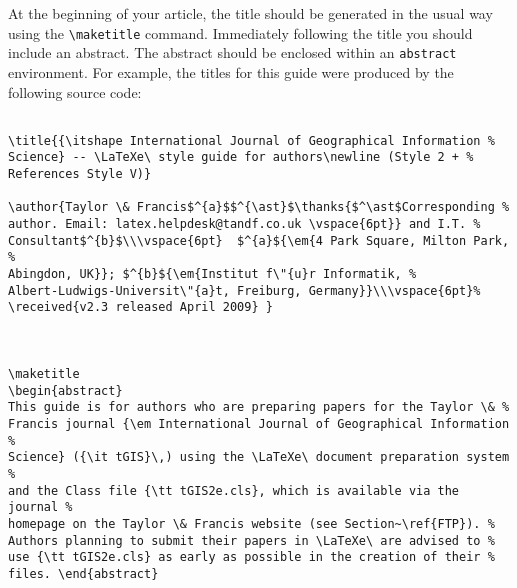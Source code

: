 \documentclass[]{tGIS2e}
\begin{document}
At the beginning of your article, the title should be generated in the usual way using the {\verb"\maketitle"}
command. Immediately following the title you should include an abstract. The abstract should be enclosed within
an {\tt abstract} environment. For example, the titles for this guide were produced by the following source code:
%
\begin{verbatim}

\title{{\itshape International Journal of Geographical Information %
Science} -- \LaTeXe\ style guide for authors\newline (Style 2 + %
References Style V)}

\author{Taylor \& Francis$^{a}$$^{\ast}$\thanks{$^\ast$Corresponding %
author. Email: latex.helpdesk@tandf.co.uk \vspace{6pt}} and I.T. %
Consultant$^{b}$\\\vspace{6pt}  $^{a}${\em{4 Park Square, Milton Park, %
Abingdon, UK}}; $^{b}${\em{Institut f\"{u}r Informatik, %
Albert-Ludwigs-Universit\"{a}t, Freiburg, Germany}}\\\vspace{6pt}%
\received{v2.3 released April 2009} }



\maketitle
\begin{abstract}
This guide is for authors who are preparing papers for the Taylor \& %
Francis journal {\em International Journal of Geographical Information %
Science} ({\it tGIS}\,) using the \LaTeXe\ document preparation system %
and the Class file {\tt tGIS2e.cls}, which is available via the journal %
homepage on the Taylor \& Francis website (see Section~\ref{FTP}). %
Authors planning to submit their papers in \LaTeXe\ are advised to %
use {\tt tGIS2e.cls} as early as possible in the creation of their %
files. \end{abstract}

\end{verbatim}

\end{document}
